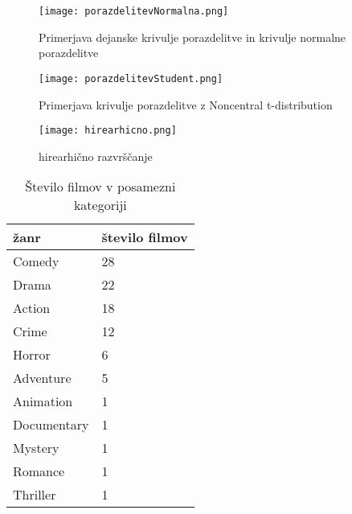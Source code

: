 \documentclass[a4paper,11pt]{article}
\begin{document}

\begin{figure}[htbp]
\begin{center}
\texttt{[image: porazdelitevNormalna.png]}
\caption{Primerjava dejanske krivulje porazdelitve in krivulje normalne porazdelitve}
\label{slika3}
\end{center}
\end{figure}


\begin{figure}[htbp]
\begin{center}
\texttt{[image: porazdelitevStudent.png]}
\caption{Primerjava krivulje porazdelitve z Noncentral t-distribution}
\label{slika4}
\end{center}
\end{figure}

\begin{figure}[htbp]
\begin{center}
\texttt{[image: hirearhicno.png]}
\caption{hirearhično razvrščanje}
\label{slika7}
\end{center}
\end{figure}

\begin{table}[htbp]
\caption{Število filmov v posamezni kategoriji}
\label{tab4}
\begin{center}
\begin{tabular}{lp{2cm}}
\hline
žanr & število filmov \\
\hline

Comedy      & 28 \\  
Drama       & 22 \\  
Action      & 18 \\  
Crime       & 12 \\  
Horror      &  6 \\  
Adventure   &  5 \\  
Animation   &  1 \\  
Documentary &  1 \\  
Mystery     &  1 \\  
Romance     &  1 \\  
Thriller    &  1 \\ 
\hline
\end{tabular}
\end{center}
\end{table}
\end{document}
